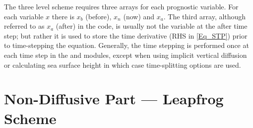\documentclass[NEMO_book]{subfiles}
\begin{document}
The three level scheme requires three arrays for each prognostic variable. 
For each variable $x$ there is $x_b$ (before), $x_n$ (now) and $x_a$. The third array, 
although referred to as $x_a$ (after) in the code, is usually not the variable at 
the after time step; but rather it is used to store the time derivative (RHS in 
\eqref{Eq_STP}) prior to time-stepping the equation. Generally, the time 
stepping is performed once at each time step in the  and  
modules, except when using implicit vertical diffusion or calculating sea surface height 
in which case time-splitting options are used.

\section{Non-Diffusive Part --- Leapfrog Scheme}
\label{STP_leap_frog}
\end{document}
